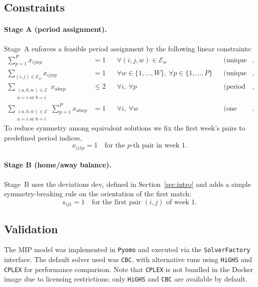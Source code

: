 \documentclass{article}
\begin{document}
\subsection{Constraints}

\paragraph{Stage A (period assignment).}
Stage~A enforces a feasible period assignment by the following linear
constraints:
\begin{align}
  \sum_{p=1}^{P} x_{ijwp} &= 1
    && \forall (i,j,w)\in\mathcal{E}_w
    && \text{(unique period per match)}, \label{eq:mip-unique-period} \\
  \sum_{(i,j)\in\mathcal{E}_w} x_{ijwp} &= 1
    && \forall w \in \{1,\ldots,W\},\ \forall p \in \{1,\ldots,P\}
    && \text{(unique match per slot)}, \label{eq:mip-unique-slot} \\
  \sum_{\substack{(a,b,w)\in\mathcal{E}\\ a=i \text{ or } b=i}} x_{abwp} &\le 2
    && \forall i,\ \forall p
    && \text{(period cap per team)}, \label{eq:mip-period-cap} \\
  \sum_{\substack{(a,b,w)\in\mathcal{E}\\ a=i \text{ or } b=i}}
  \sum_{p=1}^{P} x_{abwp} &= 1
    && \forall i,\ \forall w
    && \text{(one match per team and week)}. \label{eq:mip-team-week}
\end{align}
To reduce symmetry among equivalent solutions we fix the first week's pairs to
predefined period indices,
\[
  x_{ij1p} = 1 \quad \text{for the $p$-th pair in week 1.}
\]

\paragraph{Stage B (home/away balance).}
Stage~B uses the deviations $\mathrm{dev}_i$ defined in
Section~\ref{sec:intro} and adds a simple symmetry-breaking rule on the
orientation of the first match:
\[
  s_{ij1} = 1 \quad \text{for the first pair $(i,j)$ of week 1.}
\]


\subsection{Validation}

The MIP model was implemented in \texttt{Pyomo} and executed via the
\texttt{SolverFactory} interface.
The default solver used was \texttt{CBC}, with alternative runs using
\texttt{HiGHS} and \texttt{CPLEX} for performance comparison. Note that \texttt{CPLEX} is not bundled in the Docker image due to licensing
restrictions; only \texttt{HiGHS} and \texttt{CBC} are available by default.
\end{document}
